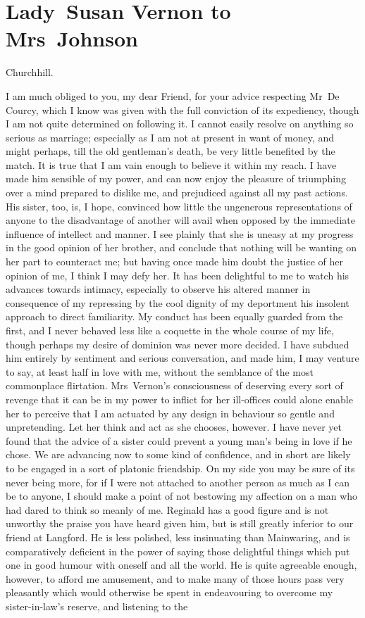 \chapter{Lady~Susan Vernon to Mrs~Johnson}
  
  \begin{mail}{Churchhill.}{}

I am much obliged to you, my dear Friend, for your advice respecting Mr~De Courcy, which I know was given with the full conviction of its expediency, though I am not quite determined on following it. I cannot easily resolve on anything so serious as marriage; especially as I am not at present in want of money, and might perhaps, till the old gentleman's death, be very little benefited by the match. It is true that I am vain enough to believe it within my reach. I have made him sensible of my power, and can now enjoy the pleasure of triumphing over a mind prepared to dislike me, and prejudiced against all my past actions. His sister, too, is, I hope, convinced how little the ungenerous representations of anyone to the disadvantage of another will avail when opposed by the immediate influence of intellect and manner. I see plainly that she is uneasy at my progress in the good opinion of her brother, and conclude that nothing will be wanting on her part to counteract me; but having once made him doubt the justice of her opinion of me, I think I may defy her. It has been delightful to me to watch his advances towards intimacy, especially to observe his altered manner in consequence of my repressing by the cool dignity of my deportment his insolent approach to direct familiarity. My conduct has been equally guarded from the first, and I never behaved less like a coquette in the whole course of my life, though perhaps my desire of dominion was never more decided. I have subdued him entirely by sentiment and serious conversation, and made him, I may venture to say, at least half in love with me, without the semblance of the most commonplace flirtation. Mrs~Vernon's consciousness of deserving every sort of revenge that it can be in my power to inflict for her ill-offices could alone enable her to perceive that I am actuated by any design in behaviour so gentle and unpretending. Let her think and act as she chooses, however. I have never yet found that the advice of a sister could prevent a young man's being in love if he chose. We are advancing now to some kind of confidence, and in short are likely to be engaged in a sort of platonic friendship. On my side you may be sure of its never being more, for if I were not attached to another person as much as I can be to anyone, I should make a point of not bestowing my affection on a man who had dared to think so meanly of me. Reginald has a good figure and is not unworthy the praise you have heard given him, but is still greatly inferior to our friend at Langford. He is less polished, less insinuating than Mainwaring, and is comparatively deficient in the power of saying those delightful things which put one in good humour with oneself and all the world. He is quite agreeable enough, however, to afford me amusement, and to make many of those hours pass very pleasantly which would otherwise be spent in endeavouring to overcome my sister-in-law's reserve, and listening to the 
\end{mail}
